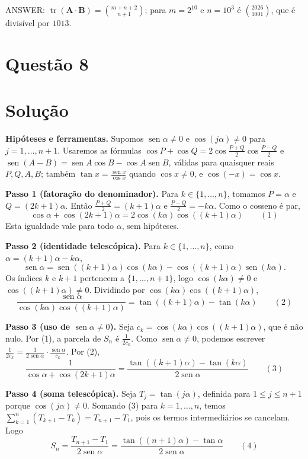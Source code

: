 \documentclass{article}%
\begin{document}
ANSWER: $\operatorname{tr}(\mathbf{A}\cdot\mathbf{B})=\binom{m+n+2}{n+1}$; para $m=2^{10}$ e $n=10^3$ é $\binom{2026}{1001}$, que é divisível por $1013$.%
\newpage%
\section*{Questão 8}

\section*{Solução}

\textbf{Hipóteses e ferramentas.} Supomos $\operatorname{sen}\alpha\neq 0$ e $\cos(j\alpha)\neq 0$ para $j=1,\dots,n+1$. Usaremos as fórmulas $\cos P+\cos Q=2\cos\frac{P+Q}{2}\cos\frac{P-Q}{2}$ e $\operatorname{sen}(A-B)=\operatorname{sen}A\cos B-\cos A\operatorname{sen}B$, válidas para quaisquer reais $P,Q,A,B$; também $\tan x=\frac{\operatorname{sen}x}{\cos x}$ quando $\cos x\neq 0$, e $\cos(-x)=\cos x$.

\textbf{Passo 1 (fatoração do denominador).} Para $k\in\{1,\dots,n\}$, tomamos $P=\alpha$ e $Q=(2k+1)\alpha$. Então $\frac{P+Q}{2}=(k+1)\alpha$ e $\frac{P-Q}{2}=-k\alpha$. Como o cosseno é par,
\[
\cos\alpha+\cos(2k+1)\alpha=2\cos(k\alpha)\cos((k+1)\alpha)\qquad (1)
\]
Esta igualdade vale para todo $\alpha$, sem hipóteses.

\textbf{Passo 2 (identidade telescópica).} Para $k\in\{1,\dots,n\}$, como $\alpha=(k+1)\alpha-k\alpha$,
\[
\operatorname{sen}\alpha=\operatorname{sen}((k+1)\alpha)\cos(k\alpha)-\cos((k+1)\alpha)\operatorname{sen}(k\alpha).
\]
Os índices $k$ e $k+1$ pertencem a $\{1,\dots,n+1\}$, logo $\cos(k\alpha)\neq 0$ e $\cos((k+1)\alpha)\neq 0$. Dividindo por $\cos(k\alpha)\cos((k+1)\alpha)$,
\[
\frac{\operatorname{sen}\alpha}{\cos(k\alpha)\cos((k+1)\alpha)}=\tan((k+1)\alpha)-\tan(k\alpha)\qquad (2)
\]

\textbf{Passo 3 (uso de $\operatorname{sen}\alpha\neq 0$).} Seja $c_k=\cos(k\alpha)\cos((k+1)\alpha)$, que é não nulo. Por (1), a parcela de $S_n$ é $\frac{1}{2c_k}$. Como $\operatorname{sen}\alpha\neq 0$, podemos escrever $\frac{1}{2c_k}=\frac{1}{2\operatorname{sen}\alpha}\cdot\frac{\operatorname{sen}\alpha}{c_k}$. Por (2),
\[
\frac{1}{\cos\alpha+\cos(2k+1)\alpha}=\frac{\tan((k+1)\alpha)-\tan(k\alpha)}{2\operatorname{sen}\alpha}\qquad (3)
\]

\textbf{Passo 4 (soma telescópica).} Seja $T_j=\tan(j\alpha)$, definida para $1\le j\le n+1$ porque $\cos(j\alpha)\neq 0$. Somando (3) para $k=1,\dots,n$, temos $\sum_{k=1}^{n}(T_{k+1}-T_k)=T_{n+1}-T_1$, pois os termos intermediários se cancelam. Logo
\[
S_n=\frac{T_{n+1}-T_1}{2\operatorname{sen}\alpha}=\frac{\tan((n+1)\alpha)-\tan\alpha}{2\operatorname{sen}\alpha}\qquad (4)
\]
\end{document}
